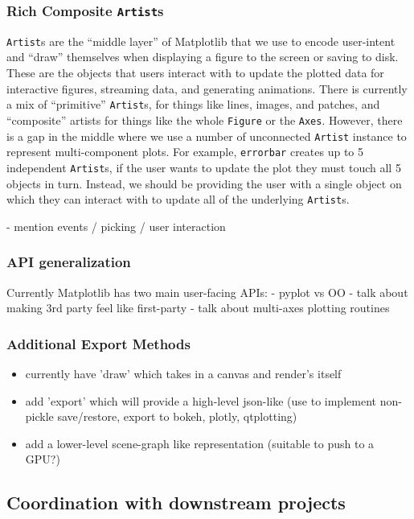 \documentclass[11pt]{article}  %
\begin{document}
\subsubsection{Rich Composite \texttt{Artist}s}
\texttt{Artist}s are the ``middle layer'' of Matplotlib that we use to
encode user-intent and ``draw'' themselves when displaying a figure to
the screen or saving to disk.  These are the objects that users
interact with to update the plotted data for interactive figures,
streaming data, and generating animations.  There is currently a mix
of ``primitive'' \texttt{Artist}s, for things like lines, images, and
patches, and ``composite'' artists for things like the whole
\texttt{Figure} or the \texttt{Axes}.  However, there is a gap in the
middle where we use a number of unconnected \texttt{Artist} instance
to represent multi-component plots.  For example, \texttt{errorbar}
creates up to 5 independent \texttt{Artist}s, if the user wants to
update the plot they must touch all 5 objects in turn.  Instead, we
should be providing the user with a single object on which they can
interact with to update all of the underlying \texttt{Artist}s.

- mention events / picking / user interaction

\subsubsection{API generalization}
Currently Matplotlib has two main user-facing APIs:
- pyplot vs OO
- talk about making 3rd party feel like first-party
- talk about multi-axes plotting routines




\subsubsection{Additional Export Methods}

\begin{itemize}
\item currently have 'draw' which takes in a canvas and render's itself
\item add 'export' which will provide a high-level json-like (use to
  implement non-pickle save/restore, export to {bokeh, plotly,
    qtplotting})
\item add a lower-level scene-graph like representation (suitable to push to a GPU?)
\end{itemize}


\subsection{Coordination with downstream projects}
\end{document}
